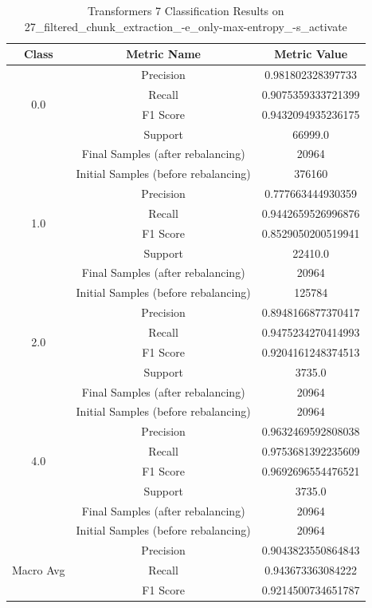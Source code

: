 \begin{longtable}{|c|c|c|}
\caption{Transformers 7 Classification Results on 27\_filtered\_chunk\_extraction\_-e\_only-max-entropy\_-s\_activate} \label{tab:27_filtered_chunk_extraction_-e_only-max-entropy_-s_activate_transformers_7_classifiers_results} \\
\hline
Class & Metric Name & Metric Value \\
\hline
\multirow{4}{*}{0.0} & Precision & 0.981802328397733 \\
 & Recall & 0.9075359333721399 \\
 & F1 Score & 0.9432094935236175 \\
 & Support & 66999.0 \\
 & Final Samples (after rebalancing) & 20964 \\
 & Initial Samples (before rebalancing) & 376160 \\
\hline
\multirow{4}{*}{1.0} & Precision & 0.777663444930359 \\
 & Recall & 0.9442659526996876 \\
 & F1 Score & 0.8529050200519941 \\
 & Support & 22410.0 \\
 & Final Samples (after rebalancing) & 20964 \\
 & Initial Samples (before rebalancing) & 125784 \\
\hline
\multirow{4}{*}{2.0} & Precision & 0.8948166877370417 \\
 & Recall & 0.9475234270414993 \\
 & F1 Score & 0.9204161248374513 \\
 & Support & 3735.0 \\
 & Final Samples (after rebalancing) & 20964 \\
 & Initial Samples (before rebalancing) & 20964 \\
\hline
\multirow{4}{*}{4.0} & Precision & 0.9632469592808038 \\
 & Recall & 0.9753681392235609 \\
 & F1 Score & 0.9692696554476521 \\
 & Support & 3735.0 \\
 & Final Samples (after rebalancing) & 20964 \\
 & Initial Samples (before rebalancing) & 20964 \\
\hline
\multirow{4}{*}{Macro Avg} & Precision & 0.9043823550864843 \\
 & Recall & 0.943673363084222 \\
 & F1 Score & 0.9214500734651787 \\

\end{longtable}
